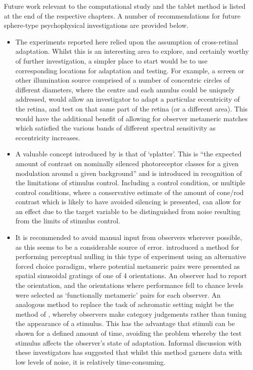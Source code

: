 Future work relevant to the computational study and the tablet method is listed at the end of the respective chapters. A number of recommendations for future sphere-type psychophysical investigations are provided below.

\begin{itemize}
\item The experiments reported here relied upon the assumption of cross-retinal adaptation. Whilst this is an interesting area to explore, and certainly worthy of further investigation, a simpler place to start would be to use corresponding locations for adaptation and testing. For example, a screen or other illumination source comprised of a number of concentric circles of different diameters, where the centre and each annulus could be uniquely addressed, would allow an investigator to adapt a particular eccentricity of the retina, and test on that same part of the retina (or a different area). This would have the additional benefit of allowing for observer metameric matches which satisfied the various bands of different spectral sensitivity as eccentricity increases.
\item A valuable concept introduced by \citet{spitschan_selective_2015} is that of `splatter'. This is ``the expected amount of contrast on nominally silenced photoreceptor
classes for a given modulation around a given background'' and is introduced in recognition of the limitations of stimulus control. Including a control condition, or multiple control conditions, where a conservative estimate of the amount of cone/rod contrast which is likely to have avoided silencing is presented, can allow for an effect due to the target variable to be distinguished from noise resulting from the limits of stimulus control. 
\item It is recommended to avoid manual input from observers wherever possible, as this seems to be a considerable source of error. \citet{allen_form_2019} introduced a method for performing perceptual nulling in this type of experiment using an alternative forced choice paradigm, where potential metameric pairs were presented as spatial sinusoidal gratings of one of 4 orientations. An observer had to report the orientation, and the orientations where performance fell to chance levels were selected as `functionally metameric' pairs for each observer. An analogous method to replace the task of achromatic setting might be the method of \citet{smithson_colour_2004}, whereby observers make category judgements rather than tuning the appearance of a stimulus. This has the advantage that stimuli can be shown for a defined amount of time, avoiding the problem whereby the test stimulus affects the observer's state of adaptation. Informal discussion with these investigators has suggested that whilst this method garners data with low levels of noise, it is relatively time-consuming.

\end{itemize}
